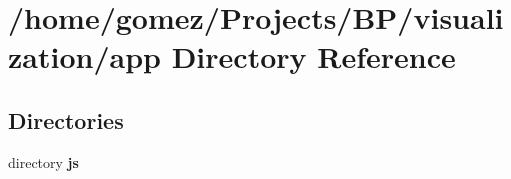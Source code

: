 \section{/home/gomez/\+Projects/\+B\+P/visualization/app Directory Reference}
\label{dir_d422163b96683743ed3963d4aac17747}
\subsection*{Directories}
\begin{DoxyCompactItemize}
\item 
directory {\bf js}
\end{DoxyCompactItemize}
